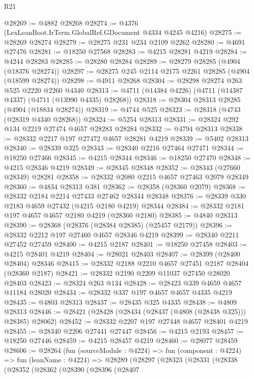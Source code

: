 \begin{lexlean}{R21}
\begin{coremodule}
@28269 := @4882 @28268
@28274 := @4376 (LexLeanBoot.IrTerm.GlobalRef.GDocument @4334 @4245 @4216)
@28275 := @28269 @28274
@28279 := @28275 @231 @234 @2109 @2262
@28280 := @4691 @27476
@28281 := @18250 @27568
@28283 := @4215 @28281 @4219
@28284 := @4244 @28283
@28285 := @28280 @28284
@28289 := @28279 @28285 (@4904 (@18376 @28274))
@28297 := @28275 @245 @2114 @2175 @2261 @28285 (@4904 (@18599 @28274))
@28298 := @4911 @28268
@28304 := @28298 @28274 @263 @525 @2220 @2260 @4340
@28313 := @4711 (@14384 @4226) (@4711 (@14387 @4337) (@4711 (@13990 @4335) @28268))
@28318 := @28304 @28313 @28285 (@4904 (@18834 @28274))
@28319 := @4744 @525
@28323 := @28318 (@4743 (@28319 @4340 @28268))
@28324 := @5254 @28313
@28331 := @28324 @292 @134 @2219 @27474 @4657 @28283 @28284
@28332 := @4794 @28313
@28338 := @28332 @2217 @197 @27472 @4657 @28281 @4219
@28339 := @5402 @28313
@28340 := @28339 @325
@28343 := @28340 @2216 @27464 @27471
@28344 := @18250 @27466
@28345 := @4215 @28344
@28346 := @18250 @27470
@28348 := @4215 @28346 @4219
@28349 := @28345 @28348
@28352 := @28343 (@27660 @28349) @28281
@28358 := @28332 @2080 @2215 @4657 @27463 @2079 @28349
@28360 := @4834 @28313 @381
@28362 := @28358 (@28360 @2079)
@28368 := @28332 @2184 @2214 @27433 @27462 @28344 @28348
@28376 := @28339 @330 @2183 @4659 @27432 (@4215 @2180 @4219) @28344
@28384 := @28332 @2181 @197 @4657 @4657 @2180 @4219 (@28360 @2180)
@28385 := @4840 @28313
@28390 := @28368 (@28376 (@28384 @28385) (@25457 @2179))
@28396 := @28332 @2212 @197 @27460 @4657 @28346 @4219
@28399 := @28340 @2211 @27452 @27459
@28400 := @4215 @2187
@28401 := @18250 @27458
@28403 := @4215 @28401 @4219
@28404 := @28021 @28403
@28407 := @28399 (@28400 @28404) @28346
@28415 := @28332 @2188 @2210 @4657 @27451 @2187 @28404 (@28360 @2187)
@28421 := @28332 @2190 @2209 @11037 @27450 @28020 @28403
@28423 := @28324 @263 @134
@28428 := @28423 @339 @4659 @4657 @11184 @28020
@28434 := @28332 @337 @197 @4657 @4657 @4335 @4219
@28435 := @4803 @28313
@28437 := @28435 @325 @4335
@28438 := @4809 @28313
@28446 := @28421 (@28428 (@28434 (@28437 (@4808 (@28438 @325))) @28385) @28062)
@28452 := @28332 @2207 @197 @27448 @4657 @28401 @4219
@28455 := @28340 @2206 @27441 @27447
@28456 := @4215 @2193
@28457 := @18250 @27446
@28459 := @4215 @28457 @4219
@28460 := @28077 @28459
@28606 := @28264
    (fun (sourceModule : @4224) =>
    fun (component : @4224) =>
    fun (leanName : @4224) =>
    @28289
      (@28297
        (@28323
          (@28331
            (@28338
              (@28352
                (@28362
                  (@28390
                    (@28396
                      (@28407

\end{coremodule}
\end{lexlean}
